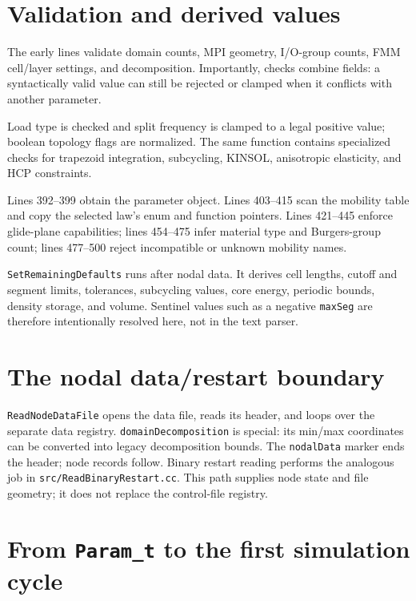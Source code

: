 \documentclass[11pt]{article}
\newcommand{\code}[1]{\texorpdfstring{\nolinkurl{#1}}{#1}}
\newcommand{\srcfile}[1]{\texorpdfstring{\nolinkurl{#1}}{#1}}
\begin{document}
\section{Validation and derived values}

The early lines validate domain counts, MPI geometry, I/O-group counts, FMM cell/layer settings, and decomposition. Importantly, checks combine fields: a syntactically valid value can still be rejected or clamped when it conflicts with another parameter.

Load type is checked and split frequency is clamped to a legal positive value; boolean topology flags are normalized. The same function contains specialized checks for trapezoid integration, subcycling, KINSOL, anisotropic elasticity, and HCP constraints.

Lines 392--399 obtain the parameter object. Lines 403--415 scan the mobility table and copy the selected law's enum and function pointers. Lines 421--445 enforce glide-plane capabilities; lines 454--475 infer material type and Burgers-group count; lines 477--500 reject incompatible or unknown mobility names.

\code{SetRemainingDefaults} runs after nodal data. It derives cell lengths, cutoff and segment limits, tolerances, subcycling values, core energy, periodic bounds, density storage, and volume. Sentinel values such as a negative \code{maxSeg} are therefore intentionally resolved here, not in the text parser.

\section{The nodal data/restart boundary}

\code{ReadNodeDataFile} opens the data file, reads its header, and loops over the separate data registry. \code{domainDecomposition} is special: its min/max coordinates can be converted into legacy decomposition bounds. The \code{nodalData} marker ends the header; node records follow. Binary restart reading performs the analogous job in \srcfile{src/ReadBinaryRestart.cc}. This path supplies node state and file geometry; it does not replace the control-file registry.

\section{From \code{Param_t} to the first simulation cycle}
\end{document}
